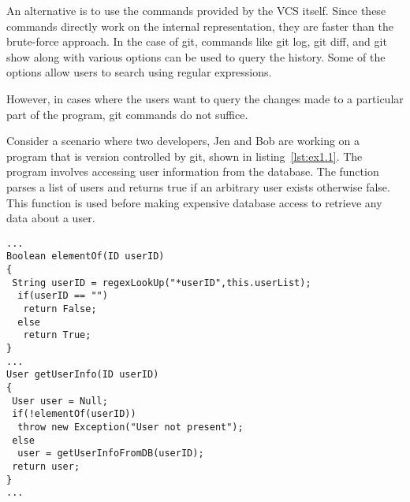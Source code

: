 An alternative is to use the commands provided by the VCS itself. Since these commands directly work on the internal representation, they are faster than the brute-force approach. In the case of git, commands like {\ttf git log}, {\ttf git diff}, and {\ttf git show} along with various options can be used to query the history. Some of the options allow users to search using regular expressions.

However, in cases where the users want to query the changes made to a particular part of the program, git commands do not suffice.
 


Consider a scenario where two developers, Jen and Bob are working on a program that is version controlled by git, shown in listing~\ref{lst:ex1.1}. The program involves accessing user information from the database. The  function parses a list of users and returns true if an arbitrary user exists otherwise false. This function is used before making expensive database access to retrieve any data about a user. 

\begin{lstlisting}[caption= Code snippet, label=lst:ex1.1, gobble=0, basicstyle=\ttfamily\small]
...
Boolean elementOf(ID userID)
{ 
 String userID = regexLookUp("*userID",this.userList);
  if(userID == "")
   return False;
  else
   return True;
}
...
User getUserInfo(ID userID)
{
 User user = Null;
 if(!elementOf(userID))
  throw new Exception("User not present");
 else
  user = getUserInfoFromDB(userID);
 return user;
}
...
\end{lstlisting}

